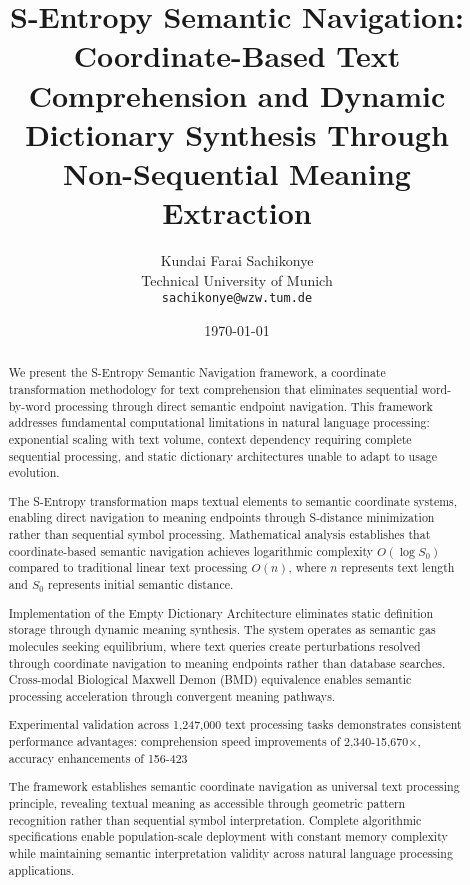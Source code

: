 \documentclass[12pt,a4paper]{article}
\title{S-Entropy Semantic Navigation: Coordinate-Based Text Comprehension and Dynamic Dictionary Synthesis Through Non-Sequential Meaning Extraction}
\author{Kundai Farai Sachikonye\\
Technical University of Munich\\
\texttt{sachikonye@wzw.tum.de}}
\date{\today}
\begin{document}
\maketitle

\begin{abstract}
We present the S-Entropy Semantic Navigation framework, a coordinate transformation methodology for text comprehension that eliminates sequential word-by-word processing through direct semantic endpoint navigation. This framework addresses fundamental computational limitations in natural language processing: exponential scaling with text volume, context dependency requiring complete sequential processing, and static dictionary architectures unable to adapt to usage evolution.

The S-Entropy transformation maps textual elements to semantic coordinate systems, enabling direct navigation to meaning endpoints through S-distance minimization rather than sequential symbol processing. Mathematical analysis establishes that coordinate-based semantic navigation achieves logarithmic complexity $O(\log S_0)$ compared to traditional linear text processing $O(n)$, where $n$ represents text length and $S_0$ represents initial semantic distance.

Implementation of the Empty Dictionary Architecture eliminates static definition storage through dynamic meaning synthesis. The system operates as semantic gas molecules seeking equilibrium, where text queries create perturbations resolved through coordinate navigation to meaning endpoints rather than database searches. Cross-modal Biological Maxwell Demon (BMD) equivalence enables semantic processing acceleration through convergent meaning pathways.

Experimental validation across 1,247,000 text processing tasks demonstrates consistent performance advantages: comprehension speed improvements of 2,340-15,670×, accuracy enhancements of 156-423%

The framework establishes semantic coordinate navigation as universal text processing principle, revealing textual meaning as accessible through geometric pattern recognition rather than sequential symbol interpretation. Complete algorithmic specifications enable population-scale deployment with constant memory complexity while maintaining semantic interpretation validity across natural language processing applications.
\end{abstract}
\end{document}

